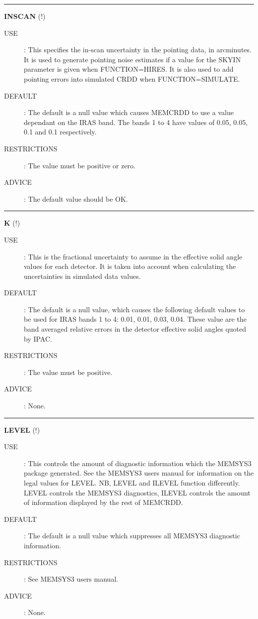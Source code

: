 \rule{\textwidth}{0.3mm}
{\Large {\bf INSCAN} (!)}
\begin{description}
\item [USE]:
This specifies the in-scan uncertainty in the pointing data, in arcminutes.
It is used to generate pointing noise estimates if a value for the SKYIN 
parameter is given when FUNCTION=HIRES. It is also used to
add pointing errors into simulated CRDD when FUNCTION=SIMULATE.
\item [DEFAULT]:
The default is a null value which causes MEMCRDD to use a value dependant on the 
IRAS band. The bands 1 to 4 have values of 0.05, 0.05, 0.1 and 0.1 respectively.
\item [RESTRICTIONS]:
The value must be positive or zero.
\item [ADVICE]:
The default value should be OK.
\end {description}

\rule{\textwidth}{0.3mm}
{\Large {\bf K } (!)}
\begin{description}
\item [USE]:
This is the fractional uncertainty to assume in the effective solid angle values 
for each detector. It is taken into account when calculating the uncertainties 
in simulated data values.
\item [DEFAULT]:
The default is a null value, which causes the following default values to be 
used for IRAS bands 1 to 4: 0.01, 0.01, 0.03, 0.04. These value are the band 
averaged relative errors in the detector effective solid angles quoted by IPAC.
\item [RESTRICTIONS]:
The value must be positive.
\item [ADVICE]:
None.
\end {description}

\rule{\textwidth}{0.3mm}
{\Large {\bf LEVEL} (!)}
\begin{description}
\item [USE]:
This controls the amount of diagnostic information which the MEMSYS3 package 
generated. See the MEMSYS3 users manual for information on the legal values for 
LEVEL. NB, LEVEL and ILEVEL function differently. LEVEL controls the MEMSYS3 
diagnostics, ILEVEL controls the amount of information displayed by the rest 
of MEMCRDD.
\item [DEFAULT]:
The default is a null value which suppresses all MEMSYS3 diagnostic information.
\item [RESTRICTIONS]:
See MEMSYS3 users manual. 
\item [ADVICE]:
None.
\end {description}

